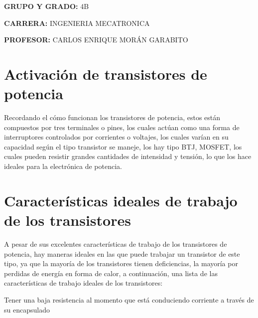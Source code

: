 \documentclass[12pt]{article}
\begin{document}
\begin{Center}
\textbf{GRUPO Y GRADO: }4B
\end{Center}\par

\begin{Center}
\textbf{CARRERA: }INGENIERIA MECATRONICA
\end{Center}\par

\begin{Center}
\textbf{PROFESOR: }CARLOS ENRIQUE MORÁN GARABITO
\end{Center}\par


\vspace{\baselineskip}

\vspace{\baselineskip}

\vspace{\baselineskip}

\vspace{\baselineskip}
\newpage
\section{Activación de transistores de potencia}
\setlength{\parskip}{22.2pt}
Recordando el cómo funcionan los transistores de potencia, estos están compuestos por tres terminales o pines, los cuales actúan como una forma de interruptores controlados por corrientes o voltajes, los cuales varían en su capacidad según el tipo transistor se maneje, los hay tipo BTJ, MOSFET, los cuales pueden resistir grandes cantidades de intensidad y tensión, lo que los hace ideales para la electrónica de potencia.\par

\setlength{\parskip}{8.04pt}
\section{Características ideales de trabajo de los transistores}
\setlength{\parskip}{11.52pt}
A pesar de sus excelentes características de trabajo de los transistores de potencia, hay maneras ideales en las que puede trabajar un transistor de este tipo, ya que la mayoría de los transistores tienen deficiencias, la mayoría por perdidas de energía en forma de calor, a continuación, una lista de las características de trabajo ideales de los transistores:\par

\setlength{\parskip}{8.52pt}
\begin{adjustwidth}{0.25in}{0.0in}
Tener una baja resistencia al momento que está conduciendo corriente a través de su encapsulado\par

\end{adjustwidth}
\end{document}

